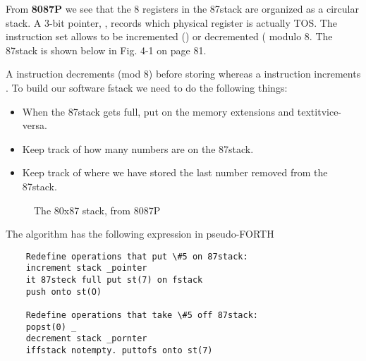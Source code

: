 From \textbf{8087P} we see that the 8 registers in the 87stack are organized as a circular stack. A 3-bit pointer, , records which physical register is actually TOS. The instruction set allows  to be incremented () or decremented ( modulo 8. The 87stack is shown below in Fig. 4-1 on page 81.

A  instruction decrements  (mod 8) before storing whereas a  instruction increments . To build our software fstack we need to do the following things:
\begin{itemize}
    \item When the 87stack gets full, put  on the memory extensions and textit{vice-versa}.
    \item Keep track of how many numbers are on the 87stack.
    \item Keep track of where we have stored the last number removed from the 87stack.
\end{itemize}

\begin{figure}
    \center
    \caption{The 80x87 stack, from 8087P}
    \label{fig:04_01}
\end{figure}

The algorithm has the following expression in pseudo-FORTH

\begin{lstlisting}
    Redefine operations that put \#5 on 87stack:
    increment stack _pointer
    it 87steck full put st(7) on fstack
    push onto st(O)

    Redefine operations that take \#5 off 87stack:
    popst(0) _
    decrement stack _pornter
    iffstack notempty. puttofs onto st(7)
\end{lstlisting}

